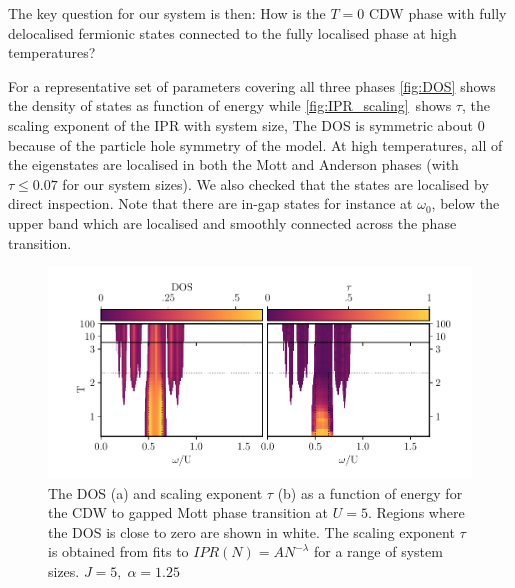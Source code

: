 The key question for our system is then: How is the \(T=0\) CDW phase with fully delocalised fermionic states connected to the fully localised phase at high temperatures?

For a representative set of parameters covering all three phases \cref{fig:DOS} shows the density of states as function of energy while \cref{fig:IPR_scaling}~shows \(\tau\), the scaling exponent of the IPR with system size, The DOS is symmetric about \(0\) because of the particle hole symmetry of the model. At high temperatures, all of the eigenstates are localised in both the Mott and Anderson phases (with \(\tau \leq 0.07\) for our system sizes). We also checked that the states are localised by direct inspection. Note that there are in-gap states for instance at \(\omega_0\), below the upper band which are localised and smoothly connected across the phase transition.

\hypertarget{fig:gap_opening_U5}{%
\begin{figure}
\centering
\includegraphics[width=1\textwidth,height=\textheight]{figure_code/fk_chapter/gap_opening/gap_opening_U5}
\caption[{The transition from CDW to the Mott phase}]{The DOS (a) and scaling exponent \(\tau\) (b) as a function of energy for the CDW to gapped Mott phase transition at \(U=5\). Regions where the DOS is close to zero are shown in white. The scaling exponent \(\tau\) is obtained from fits to \(IPR(N) = A N^{-\lambda}\) for a range of system sizes. \(J = 5,\;\alpha = 1.25\)}
\label{fig:gap_opening_U5}
\end{figure}
}

